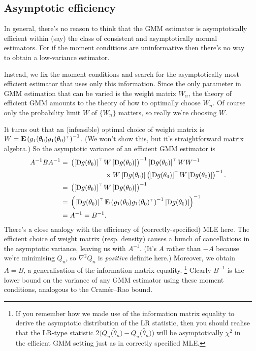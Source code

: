\documentclass[11pt,letterpaper,reqno,oneside]{article}
\begin{document}
\subsection{Asymptotic efficiency}
\label{sec:GMM:asymptotic_efficiency}

In general, there's no reason to think that the GMM estimator is asymptotically efficient within (say) the class of consistent and asymptotically normal estimators. For if the moment conditions are uninformative then there's no way to obtain a low-variance estimator.

Instead, we fix the moment conditions and search for the asymptotically most efficient estimator that uses only this information. Since the only parameter in GMM estimation that can be varied is the weight matrix $W_n$, the theory of efficient GMM amounts to the theory of how to optimally choose $W_n$. Of course only the probability limit $W$ of $\{ W_n \}$ matters, so really we're choosing $W$.

It turns out that an (infeasible) optimal choice of weight matrix is $W = \mathbf{E}\left( g_1(\theta_0) g_1(\theta_0)^{\scriptscriptstyle \top} \right)^{-1}$. (We won't show this, but it's straightforward matrix algebra.) So the asymptotic variance of an efficient GMM estimator is
%
\begin{align*}
	A^{-1} B A^{-1}
	={}& 
	\left( \left[ \mathrm{D} g(\theta_0) \right]^{\scriptscriptstyle \top} W \left[ \mathrm{D} g(\theta_0) \right] \right)^{-1}
	\left[ \mathrm{D} g(\theta_0) \right]^{\scriptscriptstyle \top} W 
	W^{-1}
	\\ 
	&\quad\quad\quad\quad\quad\times
	W \left[ \mathrm{D} g(\theta_0) \right]
	\left( \left[ \mathrm{D} g(\theta_0) \right]^{\scriptscriptstyle \top} W \left[ \mathrm{D} g(\theta_0) \right] \right)^{-1} .
	\\
	={}& \left( \left[ \mathrm{D} g(\theta_0) \right]^{\scriptscriptstyle \top} 
	W \left[ \mathrm{D} g(\theta_0) \right] \right)^{-1}
	\\
	={}& \left( \left[ \mathrm{D} g(\theta_0) \right]^{\scriptscriptstyle \top} 
	\mathbf{E}\left( g_1(\theta_0) g_1(\theta_0)^{\scriptscriptstyle \top} \right)^{-1} 
	\left[ \mathrm{D} g(\theta_0) \right] \right)^{-1}	
	\\
	={}& A^{-1} = B^{-1} .
\end{align*}
%
There's a close analogy with the efficiency of (correctly-specified) MLE here. The efficient choice of weight matrix (resp. density) causes a bunch of cancellations in the asymptotic variance, leaving us with $A^{-1}$. (It's $A$ rather than $-A$ because we're minimising $Q_n$, so $\nabla^2 Q_n$ is \emph{positive} definite here.) Moreover, we obtain $A=B$, a generalisation of the information matrix equality.%
	\footnote{If you remember how we made use of the information matrix equality to derive the asymptotic distribution of the LR statistic, then you should realise that the LR-type statistic $2\bigl( Q_n\bigl( \widetilde{\theta}_n \bigr) - Q_n\bigl( \widehat{\theta}_n \bigr) \bigr)$ will be asymptotically $\chi^2$ in the efficient GMM setting just as in correctly specified MLE.}
Clearly $B^{-1}$ is the lower bound on the variance of any GMM estimator using these moment conditions, analogous to the Cramér--Rao bound.
\end{document}
